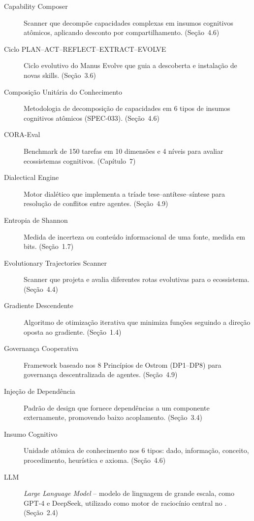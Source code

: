 \begin{description}
\item[Capability Composer] Scanner que decompõe capacidades complexas em
insumos cognitivos atômicos, aplicando desconto por compartilhamento.
(Seção~4.6)

\item[Ciclo PLAN--ACT--REFLECT--EXTRACT--EVOLVE] Ciclo evolutivo do
Manus Evolve que guia a descoberta e instalação de novas skills.
(Seção~3.6)

\item[Composição Unitária do Conhecimento] Metodologia de decomposição
de capacidades em 6 tipos de insumos cognitivos atômicos (SPEC-033).
(Seção~4.6)

\item[CORA-Eval] Benchmark de 150 tarefas em 10 dimensões e 4 níveis
para avaliar ecossistemas cognitivos. (Capítulo~7)

\item[Dialectical Engine] Motor dialético que implementa a tríade
tese--antítese--síntese para resolução de conflitos entre agentes.
(Seção~4.9)

\item[Entropia de Shannon] Medida de incerteza ou conteúdo informacional
de uma fonte, medida em bits. (Seção~1.7)

\item[Evolutionary Trajectories Scanner] Scanner que projeta e avalia
diferentes rotas evolutivas para o ecossistema. (Seção~4.4)

\item[Gradiente Descendente] Algoritmo de otimização iterativa que
minimiza funções seguindo a direção oposta ao gradiente. (Seção~1.4)

\item[Governança Cooperativa] Framework baseado nos 8 Princípios de
Ostrom (DP1--DP8) para governança descentralizada de agentes.
(Seção~4.9)

\item[Injeção de Dependência] Padrão de design que fornece dependências
a um componente externamente, promovendo baixo acoplamento.
(Seção~3.4)

\item[Insumo Cognitivo] Unidade atômica de conhecimento nos 6 tipos:
dado, informação, conceito, procedimento, heurística e axioma.
(Seção~4.6)

\item[LLM] \emph{Large Language Model} -- modelo de linguagem de grande
escala, como GPT-4 e DeepSeek, utilizado como motor de raciocínio
central no \opencodeeco{}. (Seção~2.4)


\end{description}
